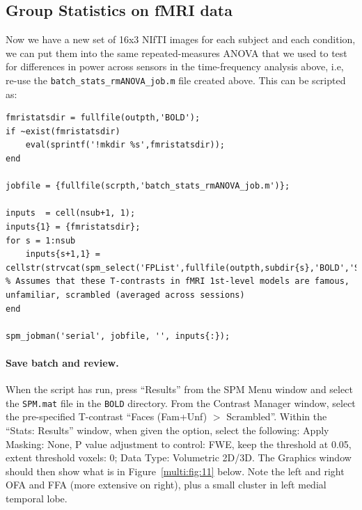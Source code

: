 \subsection{Group Statistics on fMRI data}

Now we have a new set of 16x3 NIfTI images for each subject and each condition, we can put them into the same repeated-measures ANOVA that we used to test for differences in power across sensors in the time-frequency analysis above, i.e, re-use the \texttt{batch\_stats\_rmANOVA\_job.m} file created above. This can be scripted as:

\begin{lstlisting}[style=Matlab-editor,basicstyle=\mlttfamily\footnotesize]
fmristatsdir = fullfile(outpth,'BOLD');
if ~exist(fmristatsdir)
    eval(sprintf('!mkdir %s',fmristatsdir));
end

jobfile = {fullfile(scrpth,'batch_stats_rmANOVA_job.m')};

inputs  = cell(nsub+1, 1);
inputs{1} = {fmristatsdir};
for s = 1:nsub
    inputs{s+1,1} = cellstr(strvcat(spm_select('FPList',fullfile(outpth,subdir{s},'BOLD','Stats'),'con_000[345].nii')));   % Assumes that these T-contrasts in fMRI 1st-level models are famous, unfamiliar, scrambled (averaged across sessions)
end

spm_jobman('serial', jobfile, '', inputs{:});
\end{lstlisting}

\paragraph{Save batch and review.}

When the script has run, press ``Results'' from the SPM Menu window and select the \texttt{SPM.mat} file in the \texttt{BOLD} directory. From the Contrast Manager window, select the pre-specified T-contrast ``Faces (Fam+Unf) \(>\) Scrambled''.  Within the ``Stats: Results'' window, when given the option, select the following:  Apply Masking: None, P value adjustment to control: FWE, keep the threshold at 0.05, extent threshold {voxels}: 0; Data Type: Volumetric 2D/3D. The Graphics window should then show what is in Figure~\ref{multi:fig:11} below. Note the left and right OFA and FFA (more extensive on right), plus a small cluster in left medial temporal lobe.

